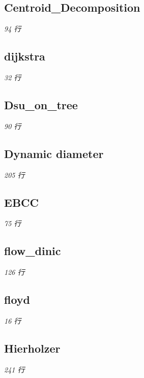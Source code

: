 \documentclass[12pt, UTF8]{ctexart}
\begin{document}
\subsection{Centroid\_Decomposition}\hfill\normalsize\textit{94 行}



\subsection{dijkstra}\hfill\normalsize\textit{32 行}



\subsection{Dsu\_on\_tree}\hfill\normalsize\textit{90 行}



\subsection{Dynamic diameter}\hfill\normalsize\textit{205 行}



\subsection{EBCC}\hfill\normalsize\textit{75 行}



\subsection{flow\_dinic}\hfill\normalsize\textit{126 行}



\subsection{floyd}\hfill\normalsize\textit{16 行}



\subsection{Hierholzer}\hfill\normalsize\textit{241 行}
\end{document}
